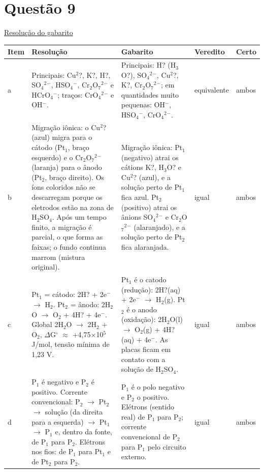 \documentclass{article}%
\begin{document}
\section*{Questão 9}%
\href{https://poliedroresolve.sistemapoliedro.com.br/vestibulares/ita/2026/ita-2-fase-dia-2-29-10-2025-2-fase-dia-2/dissertativa-9-quimica-2-fase-dia-2-ita-2026}{Resolução do gabarito}\par\smallskip%
\begin{longtable}{@{}p{} p{} p{} p{} p{}@{}}\toprule Item & Resolução & Gabarito & Veredito & Certo \\ \midrule
a & Principais: Cu$^2$?, K?, H?, SO$_{4}$$^2$$^{-}$, HSO$_{4}$$^{-}$, Cr$_{2}$O$_{7}$$^2$$^{-}$ e HCrO$_{4}$$^{-}$; traços: CrO$_{4}$$^2$$^{-}$ e OH$^{-}$. & Principais: H? (H$_{3}$O?), SO$_{4}$$^2$$^{-}$, Cu$^2$?, K?, Cr$_{2}$O$_{7}$$^2$$^{-}$; em quantidades muito pequenas: OH$^{-}$, HSO$_{4}$$^{-}$, CrO$_{4}$$^2$$^{-}$. & equivalente & ambos \\
b & Migração iônica: o Cu$^2$? (azul) migra para o cátodo (Pt$_{1}$, braço esquerdo) e o Cr$_{2}$O$_{7}$$^2$$^{-}$ (laranja) para o ânodo (Pt$_{2}$, braço direito). Os íons coloridos não se descarregam porque os eletrodos estão na zona de H$_{2}$SO$_{4}$. Após um tempo finito, a migração é parcial, o que forma as faixas; o fundo continua marrom (mistura original). & Migração iônica: Pt$_{1}$ (negativo) atrai os cátions K?, H$_{3}$O? e Cu$^2$? (azul), e a solução perto de Pt$_{1}$ fica azul. Pt$_{2}$ (positivo) atrai os ânions SO$_{4}$$^2$$^{-}$ e Cr$_{2}$O$_{7}$$^2$$^{-}$ (alaranjado), e a solução perto de Pt$_{2}$ fica alaranjada. & igual & ambos \\
c & Pt$_{1}$ = cátodo: 2H? + 2e$^{-}$ $\to$ H$_{2}$. Pt$_{2}$ = ânodo: 2H$_{2}$O $\to$ O$_{2}$ + 4H? + 4e$^{-}$. Global 2H$_{2}$O $\to$ 2H$_{2}$ + O$_{2}$, $\Delta$G$^\circ$ $\approx$ +4,75$\times$10$^{5}$ J/mol, tensão mínima de 1,23 V. & Pt$_{1}$ é o catodo (redução): 2H?(aq) + 2e$^{-}$ $\to$ H$_{2}$(g). Pt$_{2}$ é o anodo (oxidação): 2H$_{2}$O(l) $\to$ O$_{2}$(g) + 4H?(aq) + 4e$^{-}$. As placas ficam em contato com a solução de H$_{2}$SO$_{4}$. & igual & ambos \\
d & P$_{1}$ é negativo e P$_{2}$ é positivo. Corrente convencional: P$_{2}$ $\to$ Pt$_{2}$ $\to$ solução (da direita para a esquerda) $\to$ Pt$_{1}$ $\to$ P$_{1}$ e, dentro da fonte, de P$_{1}$ para P$_{2}$. Elétrons nos fios: de P$_{1}$ para Pt$_{1}$ e de Pt$_{2}$ para P$_{2}$. & P$_{1}$ é o polo negativo e P$_{2}$ o positivo. Elétrons (sentido real) de P$_{1}$ para P$_{2}$; corrente convencional de P$_{2}$ para P$_{1}$ pelo circuito externo. & igual & ambos \\
\bottomrule\end{longtable}%
\end{document}
